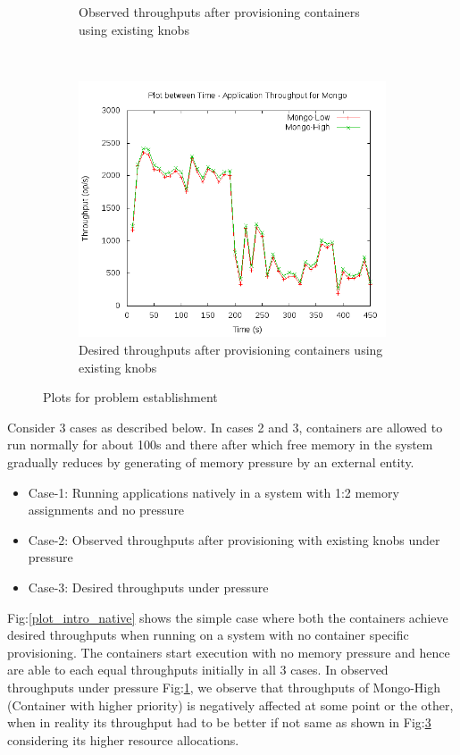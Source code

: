 \begin{figure}[t!]
\begin{subfigure}[t]{0.48\textwidth}
	    \caption{Observed throughputs after provisioning containers using existing knobs}
	    \label{plot_intro_observed}
	  \end{subfigure}
	  ~ 
	  \begin{subfigure}[t]{0.48\textwidth}
	    \centering
	    \includegraphics[width=1\textwidth]{images/intro/desired.png}
	    \caption{Desired throughputs after provisioning containers using existing knobs}
	    \label{plot_intro_desired}
	  \end{subfigure}
	  \caption{Plots for problem establishment}
	\end{figure}
	
	Consider 3 cases as described below. In cases 2 and 3, containers are allowed to run normally for about 100s and there after 
which free memory in the system gradually reduces by generating of memory pressure by an external entity. 
	
	\begin{itemize}
	  \item Case-1: Running applications natively in a system with 1:2 memory assignments and no pressure 
	  \item Case-2: Observed throughputs after provisioning with existing knobs under pressure
	  \item Case-3: Desired throughputs under pressure
	\end{itemize}
	
	Fig:\ref{plot_intro_native} shows the simple case where both the containers achieve desired throughputs when running on a system 
with no container specific provisioning. The containers start execution with no memory pressure and hence are able to each equal 
throughputs initially in all 3 cases. In observed throughputs under pressure Fig:\ref{plot_intro_observed}, we observe that throughputs of 
Mongo-High (Container with higher priority) is negatively affected at some point or the other, when in reality its throughput had to be 
better if not same as shown in Fig:\ref{plot_intro_desired} considering its higher resource allocations. 
	
